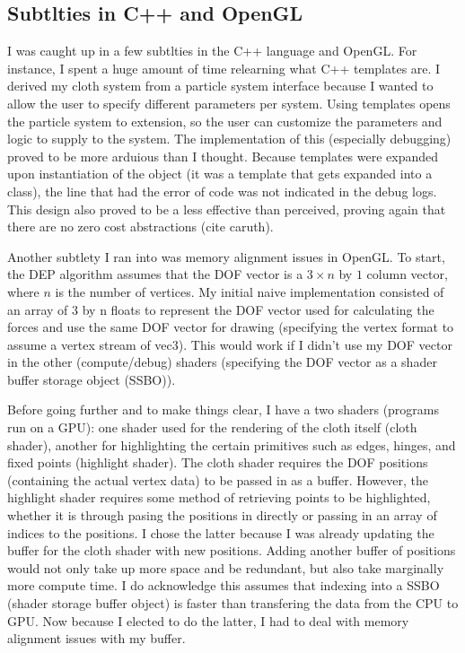 \documentclass[letterpaper, 10 pt, conference]{ieeeconf}  %
\begin{document}
\subsection{Subtlties in C++ and OpenGL}
        I was caught up in a few subtlties in the C++ language and OpenGL. For instance, I spent a huge amount of time relearning what C++ templates are. I derived my cloth system from a particle system interface because I wanted to allow the user to specify different parameters per system. Using templates opens the particle system to extension, so the user can customize the parameters and logic to supply to the system. The implementation of this (especially debugging) proved to be more arduious than I thought. Because templates were expanded upon instantiation of the object (it was a template that gets expanded into a class), the line that had the error of code was not indicated in the debug logs. This design also proved to be a less effective than perceived, proving again that there are no zero cost abstractions (cite caruth). 

        Another subtlety I ran into was memory alignment issues in OpenGL. To start, the DEP algorithm assumes that the DOF vector is a $ 3 \times n $ by $ 1 $ column vector, where $n$ is the number of vertices. My initial naive implementation consisted of an array of 3 by n floats to represent the DOF vector used for calculating the forces and use the same DOF vector for drawing (specifying the vertex format to assume a vertex stream of vec3). This would work if I didn't use my DOF vector in the other (compute/debug) shaders (specifying the DOF vector as a shader buffer storage object (SSBO)).

        Before going further and to make things clear, I have a two shaders (programs run on a GPU): one shader used for the rendering of the cloth itself (cloth shader), another for highlighting the certain primitives such as edges, hinges, and fixed points (highlight shader). The cloth shader requires the DOF positions (containing the actual vertex data) to be passed in as a buffer. However, the highlight shader requires some method of retrieving points to be highlighted, whether it is through pasing the positions in directly or passing in an array of indices to the positions. I chose the latter because I was already updating the buffer for the cloth shader with new positions. Adding another buffer of positions would not only take up more space and be redundant, but also take marginally more compute time. I do acknowledge this assumes that indexing into a SSBO (shader storage buffer object) is faster than transfering the data from the CPU to GPU. Now because I elected to do the latter, I had to deal with memory alignment issues with my buffer. 
\end{document}
